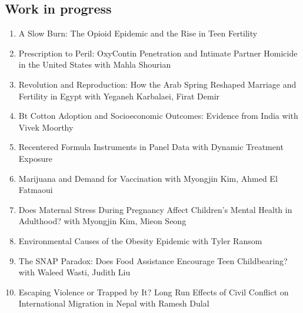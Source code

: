 \documentclass[10.5pt]{article}
\begin{document}
\subsection{Work in progress}
\begin{enumerate}
\item A Slow Burn: The Opioid Epidemic and the Rise in Teen Fertility
\item Prescription to Peril: OxyContin Penetration and Intimate Partner Homicide in the United States with Mahla Shourian
\item Revolution and Reproduction: How the Arab Spring Reshaped Marriage and Fertility in Egypt with Yeganeh Karbalaei, Firat Demir
\item Bt Cotton Adoption and Socioeconomic Outcomes: Evidence from India with Vivek Moorthy
\item Recentered Formula Instruments in Panel Data with Dynamic Treatment Exposure
\item Marijuana and Demand for Vaccination with Myongjin Kim, Ahmed El Fatmaoui
\item Does Maternal Stress During Pregnancy Affect Children's Mental Health in Adulthood? with Myongjin Kim, Mieon Seong
\item Environmental Causes of the Obesity Epidemic with Tyler Ransom
\item The SNAP Paradox: Does Food Assistance Encourage Teen Childbearing? with Waleed Wasti, Judith Liu
\item Escaping Violence or Trapped by It? Long Run Effects of Civil Conflict on International Migration in Nepal with Ramesh Dulal
\end{enumerate}
\end{document}
